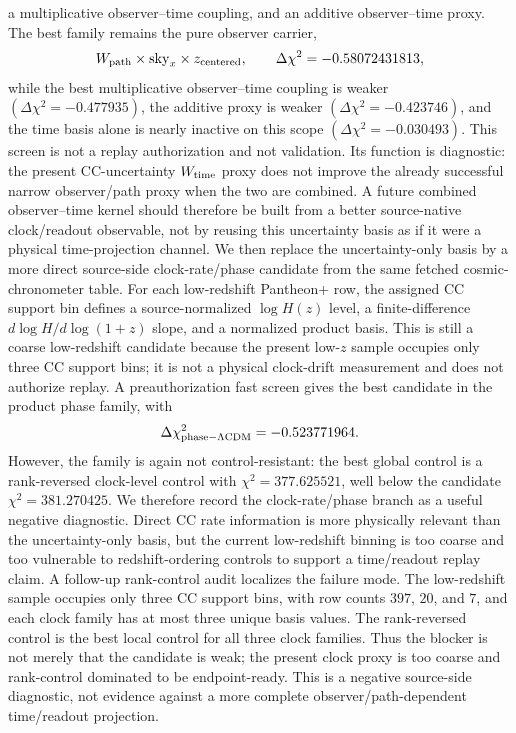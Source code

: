 \documentclass[11pt]{article}
\begin{document}
a multiplicative observer--time coupling, and an additive observer--time proxy.
The best family remains the pure observer carrier,
\[
  W_{\rm path}\times\mathrm{sky}_x\times z_{\rm centered},
  \qquad
  \Delta\chi^2=-0.58072431813,
\]
while the best multiplicative observer--time coupling is weaker
\((\Delta\chi^2=-0.477935)\), the additive proxy is weaker
\((\Delta\chi^2=-0.423746)\), and the time basis alone is nearly inactive on
this scope \((\Delta\chi^2=-0.030493)\).  This screen is not a replay
authorization and not validation.  Its function is diagnostic: the present
CC-uncertainty \(W_{\rm time}\) proxy does not improve the already successful
narrow observer/path proxy when the two are combined.  A future combined
observer--time kernel should therefore be built from a better source-native
clock/readout observable, not by reusing this uncertainty basis as if it were a
physical time-projection channel.
We then replace the uncertainty-only basis by a more direct source-side
clock-rate/phase candidate from the same fetched cosmic-chronometer table.  For
each low-redshift Pantheon+ row, the assigned CC support bin defines a
source-normalized \( \log H(z) \) level, a finite-difference
\(d\log H/d\log(1+z)\) slope, and a normalized product basis.  This is still a
coarse low-redshift candidate because the present low-\(z\) sample occupies
only three CC support bins; it is not a physical clock-drift measurement and
does not authorize replay.  A preauthorization fast screen gives the best
candidate in the product phase family, with
\[
  \Delta\chi^2_{\rm phase-\Lambda CDM}=-0.523771964.
\]
However, the family is again not control-resistant: the best global control is
a rank-reversed clock-level control with \(\chi^2=377.625521\), well below the
candidate \(\chi^2=381.270425\).  We therefore record the clock-rate/phase
branch as a useful negative diagnostic.  Direct CC rate information is more
physically relevant than the uncertainty-only basis, but the current
low-redshift binning is too coarse and too vulnerable to redshift-ordering
controls to support a time/readout replay claim.
A follow-up rank-control audit localizes the failure mode.  The low-redshift
sample occupies only three CC support bins, with row counts \(397\), \(20\),
and \(7\), and each clock family has at most three unique basis values.  The
rank-reversed control is the best local control for all three clock families.
Thus the blocker is not merely that the candidate is weak; the present clock
proxy is too coarse and rank-control dominated to be endpoint-ready.  This is a
negative source-side diagnostic, not evidence against a more complete
observer/path-dependent time/readout projection.
\end{document}
